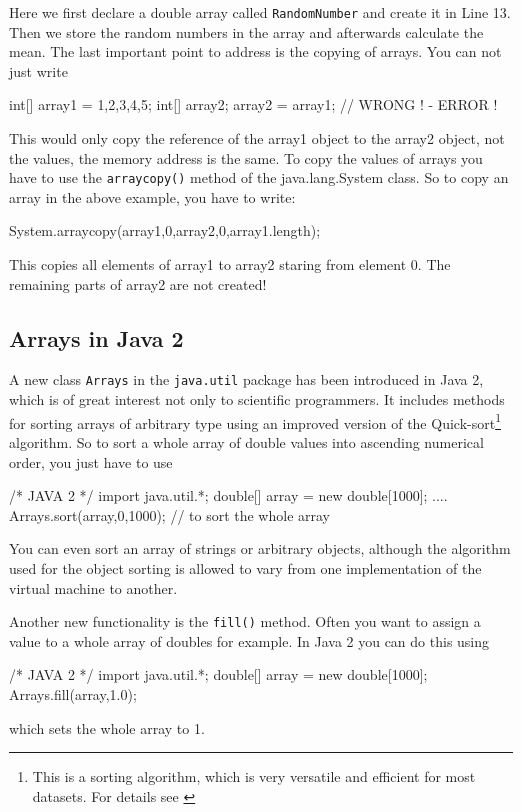 Here we first declare a double array called \verb|RandomNumber| and
create it in Line 13. Then we store the random numbers in the array
and afterwards calculate the mean.
The last important point to address is the copying of arrays. 
You can not just write
\begin{sverbatim}
  int[] array1 = {1,2,3,4,5};
  int[] array2;
  array2 = array1;          // WRONG ! - ERROR ! 
\end{sverbatim}
This would only copy the reference of the array1 object to the array2
object, not the values, the memory address is the same. 
To copy the values of arrays you have to use the 
\verb|arraycopy()| method of the java.lang.System class. 
So to copy an array in the above example, you have to write:
\begin{sverbatim}
  System.arraycopy(array1,0,array2,0,array1.length);
\end{sverbatim}
This copies all elements of array1 to array2 staring from element 0. 
The remaining parts of array2 are not created!

\subsection{Arrays in Java 2}
A new class \verb|Arrays| in the \verb|java.util| package has been
introduced in Java 2, which is of great interest not only to scientific
programmers. It includes methods for sorting arrays of arbitrary
type using an improved version of the Quick-sort\footnote{This is
a sorting algorithm, which is very versatile and efficient for
most datasets. For details see \cite[]{bentley:93}} 
algorithm. So to sort a whole array  
of double values into ascending numerical order, you just have to use
\begin{sverbatim}
  /* JAVA 2 */
  import java.util.*;
  double[] array = new double[1000];
  ....
  Arrays.sort(array,0,1000); // to sort the whole array
\end{sverbatim}
You can even sort an array of strings or arbitrary objects,
although the algorithm used for the object sorting is allowed to 
vary from one
implementation of the virtual machine to another.


Another new functionality is the \verb|fill()| method. Often you
want to assign a value to a whole array of doubles for example.
In Java 2 you can do this using
\begin{sverbatim}
  /* JAVA 2 */
  import java.util.*;
  double[] array = new double[1000];
  Arrays.fill(array,1.0);
\end{sverbatim}
which sets the whole array to 1.

